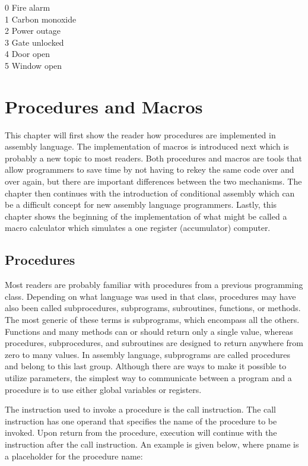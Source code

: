 \documentclass[10pt]{book}
\begin{document}
0 Fire alarm\\
1 Carbon monoxide\\
2 Power outage\\
3 Gate unlocked\\
4 Door open\\
5 Window open

\section{Procedures and Macros}
This chapter will first show the reader how procedures are implemented in assembly language. The implementation of macros is introduced next which is probably a new topic to most readers. Both procedures and macros are tools that allow programmers to save time by not having to rekey the same code over and over again, but there are important differences between the two mechanisms. The chapter then continues with the introduction of conditional assembly which can be a difficult concept for new assembly language programmers. Lastly, this chapter shows the beginning of the implementation of what might be called a macro calculator which simulates a one register (accumulator) computer.

\subsection{Procedures}
Most readers are probably familiar with procedures from a previous programming class. Depending on what language was used in that class, procedures may have also been called subprocedures, subprograms, subroutines, functions, or methods. The most generic of these terms is subprograms, which encompass all the others. Functions and many methods can or should return only a single value, whereas procedures, subprocedures, and subroutines are designed to return anywhere from zero to many values. In assembly language, subprograms are called procedures and belong to this last group. Although there are ways to make it possible to utilize parameters, the simplest way to communicate between a program and a procedure is to use either global variables or registers.

The instruction used to invoke a procedure is the call instruction. The call instruction has one operand that specifies the name of the procedure to be invoked. Upon return from the procedure, execution will continue with the instruction after the call instruction. An example is given below, where pname is a placeholder for the procedure name:
\end{document}
